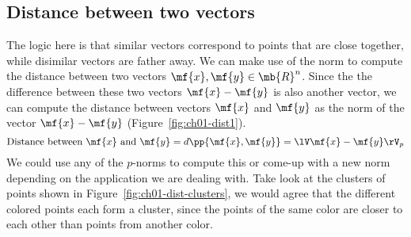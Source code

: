 \subsection{Distance between two vectors}
The logic here is that similar vectors correspond to points that are close together, while disimilar vectors are father away. We can make use of the norm to compute the distance between two vectors $\mf{x}, \mf{y} \in \mb{R}^n$. Since the the difference between these two vectors $\mf{x} - \mf{y}$ is also another vector, we can compute the distance between vectors $\mf{x}$ and $\mf{y}$ as the norm of the vector $\mf{x} - \mf{y}$ (Figure~\ref{fig:ch01-dist1}).
\[ \text{Distance between } \mf{x} \text{ and } \mf{y} = d\pp{\mf{x}, \mf{y}} = \lV \mf{x} - \mf{y} \rV_p \]
We could use any of the $p$-norms to compute this or come-up with a new norm depending on the application we are dealing with. Take look at the clusters of points shown in Figure~\ref{fig:ch01-dist-clusters}, we would agree that the different colored points each form a cluster, since the points of the same color are closer to each other than points from another color. 

